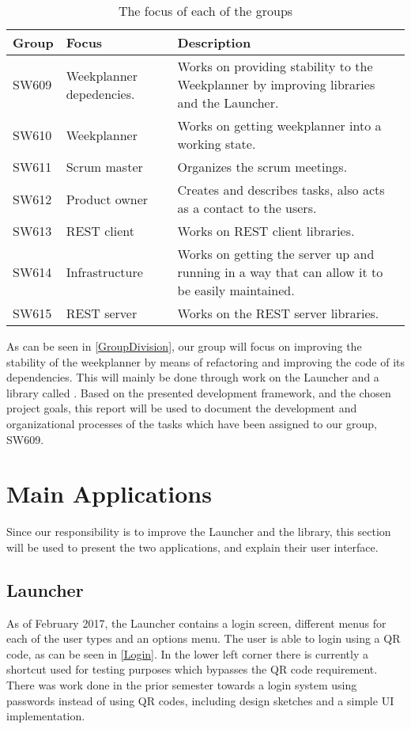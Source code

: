\begin{table}[H]
\centering
\begin{tabular}{|p{2cm}|p{3cm}|p{8cm}|}
\hline
Group & Focus & Description \\ \hline
SW609 & Weekplanner depedencies. & Works on providing
stability to the Weekplanner by improving libraries and the Launcher.\\\hline 
SW610 & Weekplanner & Works on getting weekplanner into a working
state.\\\hline 
SW611 & Scrum master & Organizes the scrum meetings. \\\hline 
SW612 & Product owner & Creates and describes tasks, also acts as a contact to
the users. \\\hline 
SW613 & REST client & Works on REST client libraries.\\ \hline

SW614 & Infrastructure & Works on getting the server up and running in a way
that can allow it to be easily maintained. \\\hline

SW615 & REST server & Works on the REST server libraries.\\ \hline

\end{tabular}
\caption{The focus of each of the groups}
\label{GroupDivision}
\end{table}

As can be seen in \autoref{GroupDivision}, our group will focus on improving the
stability of the weekplanner by means of refactoring and improving the code of
its dependencies. This will mainly be done through work on the Launcher and a
library called . Based on the presented development
framework, and the chosen project goals, this report will be used to document
the development and organizational processes of the tasks which have been
assigned to our group, SW609.

\section{Main Applications}
Since our responsibility is to improve the Launcher and the
 library, this section will be used to present the
two applications, and explain their user interface.

\subsection{Launcher}\label{LauncherReview}
As of February 2017, the Launcher contains a login screen, different menus for
each of the user types and an options menu. The user is able to login using a QR
code, as can be seen in \autoref{Login}. In the lower left corner there is
currently a shortcut used for testing purposes which bypasses the QR code
requirement. There was work done in the prior semester towards a login system
using passwords instead of using QR codes, including design sketches and a
simple UI implementation.

